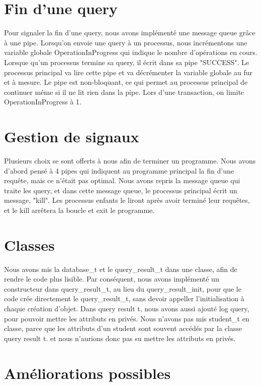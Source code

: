 \documentclass[utf8]{article}
\begin{document}
\section{Fin d'une query}
\indent{}
\par
Pour signaler la fin d'une query, nous avons implémenté une message queue grâce à une pipe. Lorsqu'on envoie 
une query à un processus, nous incrémentons une variable globale OperationInProgress qui indique le nombre d'opérations en cours.
Lorsque qu'un processus termine sa query, il écrit dans sa pipe "SUCCESS". Le processus principal va lire cette pipe et va décrémenter
la variable globale au fur et à mesure. Le pipe est non-bloquant, ce qui permet au processus principal de continuer
même si il ne lit rien dans la pipe. Lors d'une transaction, on limite OperationInProgress à 1.

\section{Gestion de signaux}
\indent{}
\par
Plusieurs choix se sont offerts à nous afin de terminer un programme. Nous avons d'abord pensé à 4 pipes qui indiquent au programme principal 
la fin d'une requête, mais ce n'était pas optimal.
Nous avons repris la message queue qui traite les query, et dans 
cette message queue, le processus principal écrit un message, "kill". Les processus enfants le liront après avoir terminé leur requêtes,
et le kill arrêtera la boucle et exit le programme.


\section{Classes}
\indent{}
\par
Nous avons mis la database\_t et le query\_result\_t dans une classe, afin de rendre le code plus lisible. Par conséquent,
nous avons implémenté un constructeur dans query\_result\_t, au lieu du query\_result\_init, pour que le code
crée directement le query\_result\_t, sans devoir appeller l'initialisation à chaque création d'objet.
Dans query result t, nous avons aussi ajouté log query, pour pouvoir mettre les attributs en privés.
Nous n'avons pas mis student\_t en classe, parce que les attributs d'un student sont souvent accédés par la classe query result t.
et nous n'aurions donc pas su mettre les attributs en privés.


\section{Améliorations possibles}
\end{document}
